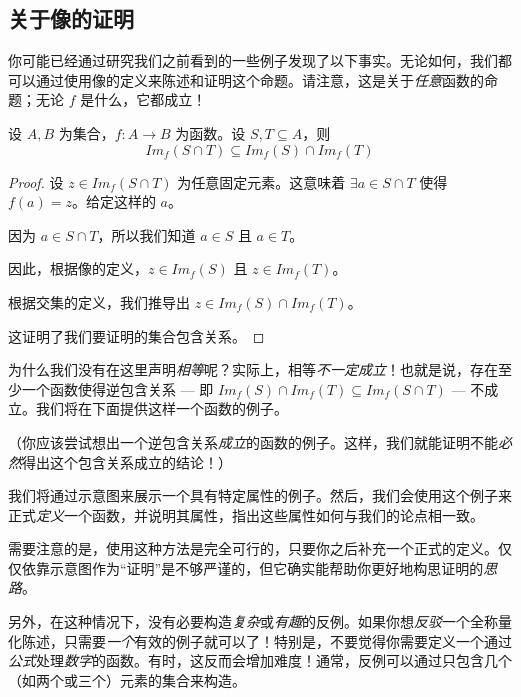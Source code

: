 
\subsection{关于像的证明}

你可能已经通过研究我们之前看到的一些例子发现了以下事实。无论如何，我们都可以通过使用像的定义来陈述和证明这个命题。请注意，这是关于\emph{任意}函数的命题；无论 $f$ 是什么，它都成立！

\begin{proposition}\label{prop:proposition7.3.6}
    设 $A,B$ 为集合，$f:A \to B$ 为函数。设 $S, T \subseteq A$，则
    \[Im_f (S \cap T) \subseteq Im_f (S) \cap Im_f (T)\]
\end{proposition}

\begin{proof}
    设 $z \in Im_f (S \cap T)$ 为任意固定元素。这意味着 $\exists a \in S \cap T$ 使得 $f(a) = z$。给定这样的 $a$。

    因为 $a \in S \cap T$，所以我们知道 $a \in S$ 且 $a \in T$。

    因此，根据像的定义，$z \in Im_f (S)$ 且 $z \in Im_f (T)$。

    根据交集的定义，我们推导出 $z \in Im_f (S) \cap Im_f (T)$。

    这证明了我们要证明的集合包含关系。
\end{proof}

为什么我们没有在这里声明\emph{相等}呢？实际上，相等\emph{不一定成立}！也就是说，存在至少一个函数使得逆包含关系 --- 即 $Im_f (S) \cap Im_f (T) \subseteq Im_f (S \cap T)$ --- 不成立。我们将在下面提供这样一个函数的例子。

（你应该尝试想出一个逆包含关系\emph{成立}的函数的例子。这样，我们就能证明不能\emph{必然}得出这个包含关系成立的结论！）

我们将通过示意图来展示一个具有特定属性的例子。然后，我们会使用这个例子来正式\emph{定义}一个函数，并说明其属性，指出这些属性如何与我们的论点相一致。

需要注意的是，使用这种方法是完全可行的，只要你之后补充一个正式的定义。仅仅依靠示意图作为``证明''是不够严谨的，但它确实能帮助你更好地构思证明的\emph{思路}。

另外，在这种情况下，没有必要构造\emph{复杂}或\emph{有趣}的反例。如果你想\emph{反驳}一个全称量化陈述，只需要\emph{一个}有效的例子就可以了！特别是，不要觉得你需要定义一个通过\emph{公式}处理\emph{数字}的函数。有时，这反而会增加难度！通常，反例可以通过只包含几个（如两个或三个）元素的集合来构造。\\


